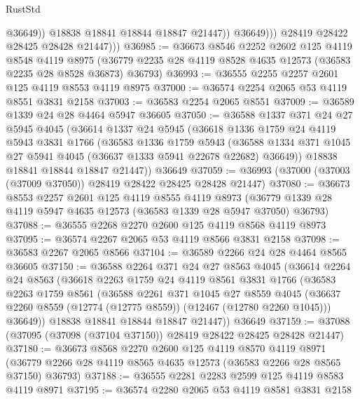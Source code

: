\begin{lexlean}{RustStd}
\begin{coremodule}
                        @36649))
                    @18838
                    @18841
                    @18844
                    @18847
                    @21447))
                @36649)))
          @28419
          @28422
          @28425
          @28428
          @21447)))
@36985 := @36673
    @8546
    @2252
    @2602
    @125
    @4119
    @8548
    @4119
    @8975
    (@36779 @2235 @28 @4119 @8528 @4635 @12573 (@36583 @2235 @28 @8528 @36873) @36793)
@36993 := @36555 @2255 @2257 @2601 @125 @4119 @8553 @4119 @8975
@37000 := @36574 @2254 @2065 @53 @4119 @8551 @3831 @2158
@37003 := @36583 @2254 @2065 @8551
@37009 := @36589 @1339 @24 @28 @4464 @5947 @36605
@37050 := @36588
    @1337
    @371
    @24
    @27
    @5945
    @4045
    (@36614
      @1337
      @24
      @5945
      (@36618
        @1336
        @1759
        @24
        @4119
        @5943
        @3831
        @1766
        (@36583
          @1336
          @1759
          @5943
          (@36588 @1334 @371 @1045 @27 @5941 @4045 (@36637 @1333 @5941 @22678 @22682) @36649))
        @18838
        @18841
        @18844
        @18847
        @21447))
    @36649
@37059 := @36993 (@37000 (@37003 (@37009 @37050)) @28419 @28422 @28425 @28428 @21447)
@37080 := @36673
    @8553
    @2257
    @2601
    @125
    @4119
    @8555
    @4119
    @8973
    (@36779 @1339 @28 @4119 @5947 @4635 @12573 (@36583 @1339 @28 @5947 @37050) @36793)
@37088 := @36555 @2268 @2270 @2600 @125 @4119 @8568 @4119 @8973
@37095 := @36574 @2267 @2065 @53 @4119 @8566 @3831 @2158
@37098 := @36583 @2267 @2065 @8566
@37104 := @36589 @2266 @24 @28 @4464 @8565 @36605
@37150 := @36588
    @2264
    @371
    @24
    @27
    @8563
    @4045
    (@36614
      @2264
      @24
      @8563
      (@36618
        @2263
        @1759
        @24
        @4119
        @8561
        @3831
        @1766
        (@36583
          @2263
          @1759
          @8561
          (@36588
            @2261
            @371
            @1045
            @27
            @8559
            @4045
            (@36637 @2260 @8559 (@12774 (@12775 @8559)) (@12467 (@12780 @2260 @1045)))
            @36649))
        @18838
        @18841
        @18844
        @18847
        @21447))
    @36649
@37159 := @37088 (@37095 (@37098 (@37104 @37150)) @28419 @28422 @28425 @28428 @21447)
@37180 := @36673
    @8568
    @2270
    @2600
    @125
    @4119
    @8570
    @4119
    @8971
    (@36779 @2266 @28 @4119 @8565 @4635 @12573 (@36583 @2266 @28 @8565 @37150) @36793)
@37188 := @36555 @2281 @2283 @2599 @125 @4119 @8583 @4119 @8971
@37195 := @36574 @2280 @2065 @53 @4119 @8581 @3831 @2158

\end{coremodule}
\end{lexlean}
